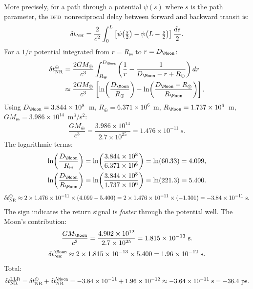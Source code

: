 \documentclass[aps,prd,twocolumn,superscriptaddress,nofootinbib,longbibliography]{revtex4-2}
\newcommand{\DFD}{\textsc{dfd}}
\begin{document}
More precisely, for a path through a potential $\psi(s)$ where $s$ is the
path parameter, the \DFD\ nonreciprocal delay between forward and backward
transit is:
\begin{equation}
\delta t_{\rm NR} = \frac{2}{c^2}\int_0^L
\left[\psi\!\left(\tfrac{s}{2}\right) - \psi\!\left(L - \tfrac{s}{2}\right)\right]
\frac{ds}{2}.
\end{equation}
For a $1/r$ potential integrated from $r = R_\oplus$ to $r = D_\Moon$:
\begin{align}
\delta t_{\rm NR}^{\rm \oplus}
&= \frac{2GM_\oplus}{c^3}\int_{R_\oplus}^{D_\Moon}
\left(\frac{1}{r} - \frac{1}{D_\Moon - r + R_\oplus}\right)dr \nonumber\\
&\approx \frac{2GM_\oplus}{c^3}
\left[\ln\!\left(\frac{D_\Moon}{R_\oplus}\right)
- \ln\!\left(\frac{D_\Moon - R_\oplus}{R_\Moon}\right)\right].
\end{align}
Using $D_\Moon = 3.844\times10^8$~m, $R_\oplus = 6.371\times10^6$~m,
$R_\Moon = 1.737\times10^6$~m, $GM_\oplus = 3.986\times10^{14}$~m$^3$/s$^2$:
\begin{equation}
\frac{GM_\oplus}{c^3} = \frac{3.986\times10^{14}}{2.7\times10^{25}}
= 1.476\times10^{-11}\ \si{s}.
\end{equation}
The logarithmic terms:
\begin{align}
\ln\!\left(\frac{D_\Moon}{R_\oplus}\right) &= \ln\!\left(\frac{3.844\times10^8}{6.371\times10^6}\right)
= \ln(60.33) = 4.099,\nonumber\\
\ln\!\left(\frac{D_\Moon}{R_\Moon}\right) &= \ln\!\left(\frac{3.844\times10^8}{1.737\times10^6}\right)
= \ln(221.3) = 5.400.
\end{align}
\begin{equation}
\delta t_{\rm NR}^{\rm \oplus}
\approx 2\times1.476\times10^{-11}\times(4.099 - 5.400)
= 2\times1.476\times10^{-11}\times(-1.301)
= -3.84\times10^{-11}\ \si{s}.
\end{equation}
The sign indicates the return signal is \emph{faster} through the potential
well.  The Moon's contribution:
\begin{equation}
\frac{GM_\Moon}{c^3} = \frac{4.902\times10^{12}}{2.7\times10^{25}}
= 1.815\times10^{-13}\ \si{s}.
\end{equation}
\begin{equation}
\delta t_{\rm NR}^{\rm \Moon}
\approx 2\times1.815\times10^{-13}\times 5.400
= 1.96\times10^{-12}\ \si{s}.
\end{equation}
Total:
\begin{equation}
\delta t_{\rm NR}^{\rm LLR}
= \delta t_{\rm NR}^{\rm \oplus} + \delta t_{\rm NR}^{\rm \Moon}
= -3.84\times10^{-11} + 1.96\times10^{-12}
\approx -3.64\times10^{-11}\ \si{s} = -36.4\ \si{ps}.
\end{equation}
\end{document}
